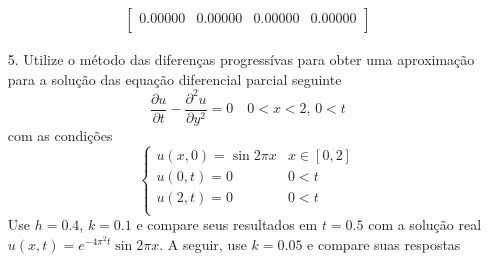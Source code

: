 \documentclass[a4paper, 11pt]{report}
\begin{document}
\begin{enumerate}[leftmargin=*]
\begin{minipage}{0.6\columnwidth}
\begin{align*}
\begin{bmatrix}
                    0.00000 & 0.00000 &  0.00000 &  0.00000\\  
                \end{bmatrix}
            \end{align*}
        \end{minipage}
        \item[5.] Utilize o método das diferenças progressívas para obter uma aproximação para a solução das equação diferencial parcial seguinte
        \[
        \dfrac{\partial u}{\partial t} - \dfrac{\partial^2 u}{\partial y^2} = 0 \quad 0 < x < 2, \, 0 < t
        \]
        com as condições
        \[
            \left\{  
                \begin{array}{ll}
                    u(x,0) = \sin 2\pi x & x \in [0,2]\\  
                    u(0,t) = 0 & 0 < t\\
                    u(2,t) = 0 & 0 < t\\
                \end{array}
            \right.
        \]
        Use $h = 0.4$, $k = 0.1$ e compare seus resultados em $t = 0.5$ com a solução real $u(x,t) = e^{-4\pi^2t}\sin 2 \pi x$. A seguir, use $k = 0.05$ e compare suas respostas
        

\end{enumerate}
\end{document}
